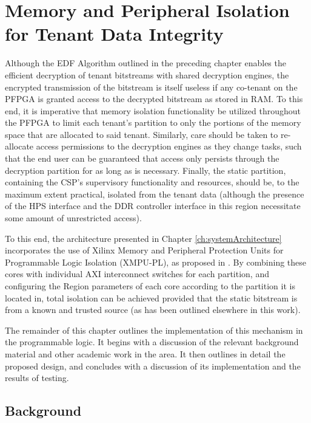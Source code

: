 
\chapter{Memory and Peripheral Isolation for Tenant Data Integrity}\label{ch:dmaProtection}
Although the EDF Algorithm outlined in the preceding chapter enables the efficient decryption of tenant bitstreams with shared decryption engines, the encrypted transmission of the bitstream is itself useless if any co-tenant on the PFPGA is granted access to the decrypted bitstream as stored in RAM. To this end, it is imperative that memory isolation functionality be utilized throughout the PFPGA to limit each tenant's partition to only the portions of the memory space that are allocated to said tenant. Similarly, care should be taken to re-allocate access permissions to the decryption engines as they change tasks, such that the end user can be guaranteed that access only persists through the decryption partition for as long as is necessary. Finally, the static partition, containing the CSP's supervisory functionality and resources, should be, to the maximum extent practical, isolated from the tenant data (although the presence of the HPS interface and the DDR controller interface in this region necessitate some amount of unrestricted access).

To this end, the architecture presented in Chapter \ref{ch:systemArchitecture} incorporates the use of Xilinx Memory and Peripheral Protection Units for Programmable Logic Isolation (XMPU-PL), as proposed in \cite{noauthor_memory_2021}. By combining these cores with individual AXI interconnect switches for each partition, and configuring the Region parameters of each core according to the partition it is located in, total isolation can be achieved provided that the static bitstream is from a known and trusted source (as has been outlined elsewhere in this work).

The remainder of this chapter outlines the implementation of this mechanism in the programmable logic. It begins with a discussion of the relevant background material and other academic work in the area. It then outlines in detail the proposed design, and concludes with a discussion of its implementation and the results of testing.

\section{Background}\label{sec:DMABackground}


